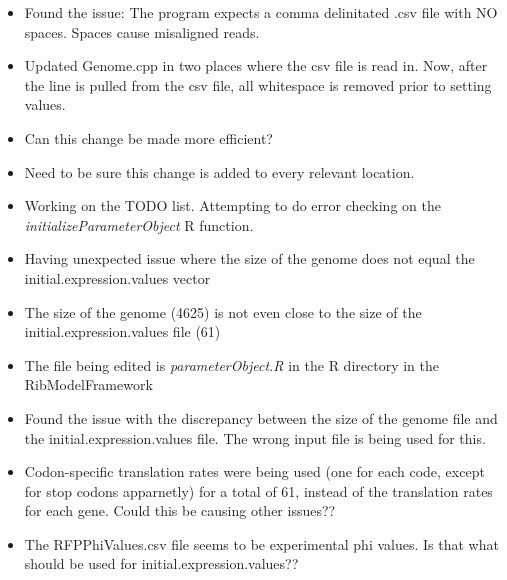\documentclass[12pt,hyperref]{labbook}
\begin{document}
\begin{itemize}
  \item Found the issue: The program expects a comma delinitated .csv file with
        NO spaces. Spaces cause misaligned reads. 
  \item Updated Genome.cpp in two places where the csv file is read in.
        Now, after the line is pulled from the csv file, all whitespace is
        removed prior to setting values. 
\end{itemize}
\begin{itemize}
  \item Can this change be made more efficient? 
  \item Need to be sure this change is added to every relevant location. 
\end{itemize}

\begin{itemize}
  \item Working on the TODO list. Attempting to do error checking on the
\textit{initializeParameterObject} R function.  
  \item Having unexpected issue where the size of the genome does not equal the
initial.expression.values vector
\end{itemize}
\begin{itemize}
  \item The size of the genome (4625) is not even close to the size of the
initial.expression.values file (61)
  \item The file being edited is \textit{parameterObject.R} in the R directory
in the RibModelFramework
\end{itemize}

\begin{itemize}
  \item Found the issue with the discrepancy between the size of the genome
file and the initial.expression.values file. The wrong input file is being used
for this. 
  \item Codon-specific translation rates were being used (one for each code,
except for stop codons apparnetly) for a total of 61, instead of the
translation rates for each gene. Could this be causing other issues??
\end{itemize}
\begin{itemize}
  \item The RFPPhiValues.csv file seems to be experimental phi values. Is that
what should be used for initial.expression.values??
\end{itemize}
\end{document}
